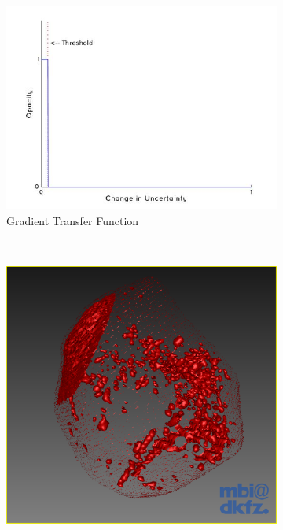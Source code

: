 \begin{figure}[H]
  \centering
  \begin{subfigure}[b]{0.5\textwidth}
    \includegraphics[width=\textwidth]{images/thresholding/thresholdvariation1fix.jpg}
    \caption{Gradient Transfer Function}
    \label{fig:thresholdvariation1fix}
  \end{subfigure}%
  ~ %
  \begin{subfigure}[b]{0.5\textwidth}
    \includegraphics[width=\textwidth]{images/thresholding/thresholdvariation1threshold1.png}

\end{subfigure}
\end{figure}
